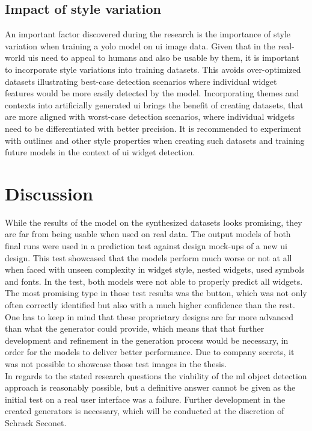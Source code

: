 \documentclass[Bachelor, BIC, english, fhCitStyle, IEEE]{BASE/twbook} %
\begin{document}
\section{Impact of style variation}
An important factor discovered during the research is the importance of style variation when training a \ac{yolo} model on \ac{ui} image data. Given that in the real-world \acp{ui} need to appeal to humans and also be usable by them, it is important to incorporate style variations into training datasets. This avoids over-optimized datasets illustrating best-case detection scenarios where individual widget features would be more easily detected by the model. Incorporating themes and contexts into artificially generated \ac{ui} brings the benefit of creating datasets, that are more aligned with worst-case detection scenarios, where individual widgets need to be differentiated with better precision. It is recommended to experiment with outlines and other style properties when creating such datasets and training future models in the context of \ac{ui} widget detection.
\chapter{Discussion}
While the results of the model on the synthesized datasets looks promising, they are far from being usable when used on real data. The output models of both final runs were used in a prediction test against design mock-ups of a new \ac{ui} design. This test showcased that the models perform much worse or not at all when faced with unseen complexity in widget style, nested widgets, used symbols and fonts. In the test, both models were not able to properly predict all widgets. The most promising type in those test results was the button, which was not only often correctly identified but also with a much higher confidence than the rest. One has to keep in mind that these proprietary designs are far more advanced than what the generator could provide, which means that that further development and refinement in the generation process would be necessary, in order for the models to deliver better performance. Due to company secrets, it was not possible to showcase those test images in the thesis.\\
In regards to the stated research questions the viability of the \ac{ml} object detection approach is reasonably possible, but a definitive answer cannot be given as the initial test on a real user interface was a failure. Further development in the created generators is necessary, which will be conducted at the discretion of Schrack Seconet.
\clearpage %
\end{document}
